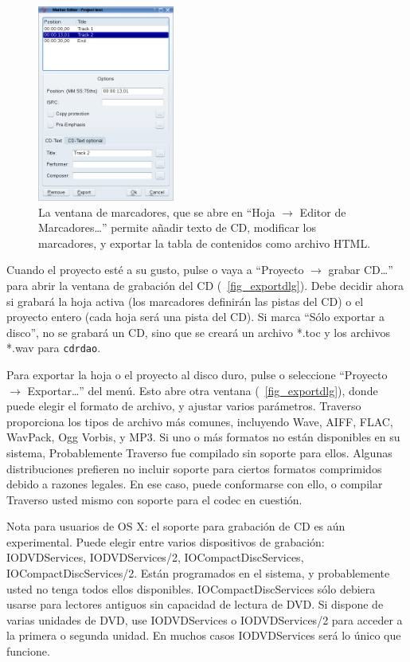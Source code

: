 \begin{figure}[ht]
 \centering\includegraphics[width=0.4\textwidth]{../images/marker-editor}
 \caption{La ventana de marcadores, que se abre en ``Hoja $\rightarrow$ Editor de Marcadores\dots'' permite añadir texto de CD, modificar los marcadores, y exportar la tabla de contenidos como archivo HTML.}
 \label{fig_marker-editor}
\end{figure}

Cuando el proyecto esté a su gusto, pulse  o vaya a ``Proyecto $\rightarrow$ grabar CD\dots'' para abrir la ventana de grabación del CD (\FigB~\ref{fig_exportdlg}). Debe decidir ahora si grabará la hoja activa (los marcadores definirán las pistas del CD) o el proyecto entero (cada hoja será una pista del CD). Si marca ``Sólo exportar a disco'', no se grabará un CD, sino que se creará un archivo *.toc y los archivos *.wav para \texttt{cdrdao}.

Para exportar la hoja o el proyecto al disco duro, pulse  o seleccione ``Proyecto $\rightarrow$ Exportar\dots'' del menú. Esto abre otra ventana (\FigB~\ref{fig_exportdlg}), donde puede elegir el formato de archivo, y ajustar varios parámetros. Traverso proporciona los tipos de archivo más comunes, incluyendo Wave, AIFF, FLAC, WavPack, Ogg Vorbis, y MP3. Si uno o más formatos no están disponibles en su sistema, Probablemente Traverso fue compilado sin soporte para ellos. Algunas distribuciones prefieren no incluir soporte para ciertos formatos comprimidos debido a razones legales. En ese caso, puede conformarse con ello, o compilar Traverso usted mismo con soporte para el codec en cuestión.

Nota para usuarios de OS X: el soporte para grabación de CD es aún experimental. Puede elegir entre varios dispositivos de grabación: IODVDServices, IODVDServices/2, IOCompactDiscServices, IOCompactDiscServices/2. Están programados en el sistema, y probablemente usted no tenga todos ellos disponibles. IOCompactDiscServices sólo debiera usarse para lectores antiguos sin capacidad de lectura de DVD. Si dispone de varias unidades de DVD, use IODVDServices o IODVDServices/2 para acceder a la primera o segunda unidad. En muchos casos IODVDServices será lo único que funcione.

